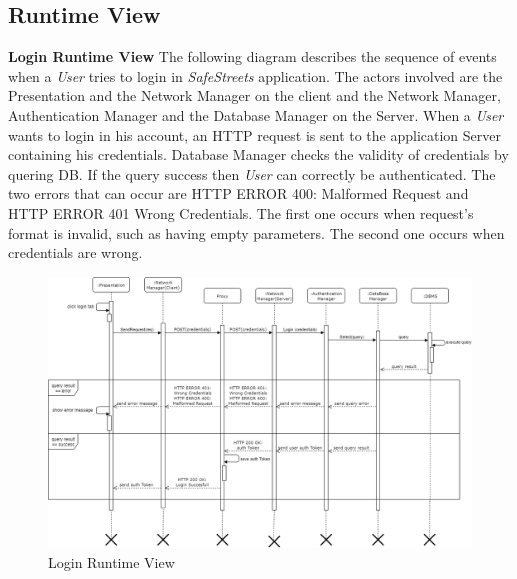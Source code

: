 \documentclass{article}
\begin{document}
\clearpage

\subsection{Runtime View}

\textbf{Login Runtime View}
The following diagram describes the sequence of events when a \textit{User} tries to login in 
\textit{SafeStreets} application. The actors involved are the Presentation and the Network Manager on the
client and the Network Manager, Authentication Manager and the Database Manager on the Server.
When a \textit{User} wants to login in his account, an HTTP request is sent to the application Server
containing his credentials. Database Manager checks the validity of credentials by quering DB. If the query
success then \textit{User} can correctly be authenticated. The two errors that can occur are HTTP ERROR 400:
Malformed Request and HTTP ERROR 401 Wrong Credentials. The first one occurs when request's format is invalid,
such as having empty parameters. The second one occurs when credentials are wrong.   

\begin{figure}[H]
    \centering
    \includegraphics[scale=0.4]{img/sequence_diagrams/login_sequence.png}
    \caption{Login Runtime View}
\end{figure}  
\end{document}
